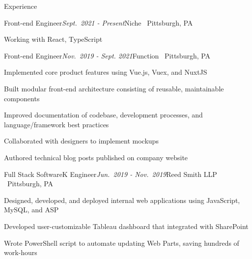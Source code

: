 \documentclass{resume} %
\begin{document}

\begin{rSection}{Experience}
\begin{rSubsection}{Front-end Engineer}{\em Sept.\ 2021 - Present}{Niche \textbar \ Pittsburgh, PA}{}
\item Working with React, TypeScript
\end{rSubsection}


\begin{rSubsection}{Front-end Engineer}{\em Nov.\ 2019 - Sept. 2021}{Function \textbar \ Pittsburgh, PA}{}
\item Implemented core product features using Vue.js, Vuex, and NuxtJS
\item Built modular front-end architecture consisting of reusable, maintainable components
\item Improved documentation of codebase, development processes, and language/framework best practices
\item Collaborated with designers to implement mockups
\item Authored technical blog posts published on company website
\end{rSubsection}


\begin{rSubsection}{Full Stack SoftwareK Engineer}{\em Jun.\ 2019 - Nov.\ 2019}{Reed Smith LLP \textbar \ Pittsburgh, PA}{}
\item Designed, developed, and deployed internal web applications using JavaScript, MySQL, and ASP
\item Developed user-customizable Tableau dashboard that integrated with SharePoint
\item Wrote PowerShell script to automate updating Web Parts, saving hundreds of work-hours
\end{rSubsection}




\end{rSection}
\end{document}
